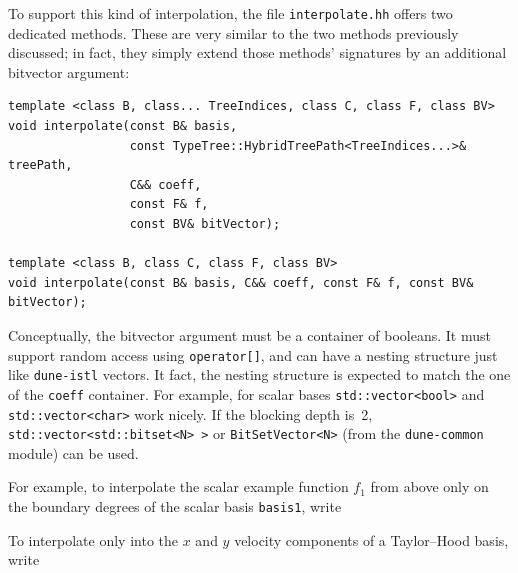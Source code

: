 \documentclass[a4paper,10pt,headings=normal,bibliography=totoc]{scrartcl}
\newcommand{\cpp}[1]{\lstinline[basicstyle=\ttfamily]!#1!}
\newcommand{\dunemodule}[1]{\texttt{#1}}
\newcommand{\file}[1]{\texttt{#1}}
\begin{document}
To support this kind of interpolation, the file \file{interpolate.hh} offers two dedicated methods.  These are very
similar to the two methods previously discussed; in fact, they simply extend those methods' signatures by an
additional bitvector argument:
\begin{lstlisting}
template <class B, class... TreeIndices, class C, class F, class BV>
void interpolate(const B& basis,
                 const TypeTree::HybridTreePath<TreeIndices...>& treePath,
                 C&& coeff,
                 const F& f,
                 const BV& bitVector);

template <class B, class C, class F, class BV>
void interpolate(const B& basis, C&& coeff, const F& f, const BV& bitVector);
\end{lstlisting}
Conceptually, the bitvector argument must be a container of booleans.  It must support random access using \cpp{operator[]},
and can have a nesting structure just like \dunemodule{dune-istl} vectors.  It fact, the nesting structure is expected
to match the one of the \cpp{coeff} container.  For example, for scalar bases \cpp{std::vector<bool>} and
\cpp{std::vector<char>} work nicely.  If the blocking depth is~2, \cpp{std::vector<std::bitset<N> >} or
\cpp{BitSetVector<N>} (from the \dunemodule{dune-common} module) can be used.

For example, to interpolate the scalar example function $f_1$ from above only on the boundary degrees of the scalar basis
\cpp{basis1}, write
%

%
To interpolate only into the $x$ and $y$ velocity components of a Taylor--Hood basis, write
%

%
\end{document}
